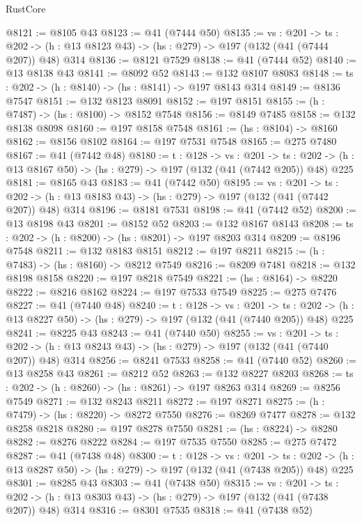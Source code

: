 \begin{lexlean}{RustCore}
\begin{coremodule}
@8121 := @8105 @43
@8123 := @41 (@7444 @50)
@8135 := {vs : @201} ->
  {ts : @202} -> (h : @13 @8123 @43) -> (hs : @279) -> @197 (@132 (@41 (@7444 @207)) @48) @314
@8136 := @8121 @7529
@8138 := @41 (@7444 @52)
@8140 := @13 @8138 @43
@8141 := @8092 @52
@8143 := @132 @8107 @8083
@8148 := {ts : @202} -> (h : @8140) -> (hs : @8141) -> @197 @8143 @314
@8149 := @8136 @7547
@8151 := @132 @8123 @8091
@8152 := @197 @8151
@8155 := (h : @7487) -> (hs : @8100) -> @8152 @7548
@8156 := @8149 @7485
@8158 := @132 @8138 @8098
@8160 := @197 @8158 @7548
@8161 := (hs : @8104) -> @8160
@8162 := @8156 @8102
@8164 := @197 @7531 @7548
@8165 := @275 @7480
@8167 := @41 (@7442 @48)
@8180 := {t : @128} ->
  {vs : @201} ->
  {ts : @202} -> (h : @13 @8167 @50) -> (hs : @279) -> @197 (@132 (@41 (@7442 @205)) @48) @225
@8181 := @8165 @43
@8183 := @41 (@7442 @50)
@8195 := {vs : @201} ->
  {ts : @202} -> (h : @13 @8183 @43) -> (hs : @279) -> @197 (@132 (@41 (@7442 @207)) @48) @314
@8196 := @8181 @7531
@8198 := @41 (@7442 @52)
@8200 := @13 @8198 @43
@8201 := @8152 @52
@8203 := @132 @8167 @8143
@8208 := {ts : @202} -> (h : @8200) -> (hs : @8201) -> @197 @8203 @314
@8209 := @8196 @7548
@8211 := @132 @8183 @8151
@8212 := @197 @8211
@8215 := (h : @7483) -> (hs : @8160) -> @8212 @7549
@8216 := @8209 @7481
@8218 := @132 @8198 @8158
@8220 := @197 @8218 @7549
@8221 := (hs : @8164) -> @8220
@8222 := @8216 @8162
@8224 := @197 @7533 @7549
@8225 := @275 @7476
@8227 := @41 (@7440 @48)
@8240 := {t : @128} ->
  {vs : @201} ->
  {ts : @202} -> (h : @13 @8227 @50) -> (hs : @279) -> @197 (@132 (@41 (@7440 @205)) @48) @225
@8241 := @8225 @43
@8243 := @41 (@7440 @50)
@8255 := {vs : @201} ->
  {ts : @202} -> (h : @13 @8243 @43) -> (hs : @279) -> @197 (@132 (@41 (@7440 @207)) @48) @314
@8256 := @8241 @7533
@8258 := @41 (@7440 @52)
@8260 := @13 @8258 @43
@8261 := @8212 @52
@8263 := @132 @8227 @8203
@8268 := {ts : @202} -> (h : @8260) -> (hs : @8261) -> @197 @8263 @314
@8269 := @8256 @7549
@8271 := @132 @8243 @8211
@8272 := @197 @8271
@8275 := (h : @7479) -> (hs : @8220) -> @8272 @7550
@8276 := @8269 @7477
@8278 := @132 @8258 @8218
@8280 := @197 @8278 @7550
@8281 := (hs : @8224) -> @8280
@8282 := @8276 @8222
@8284 := @197 @7535 @7550
@8285 := @275 @7472
@8287 := @41 (@7438 @48)
@8300 := {t : @128} ->
  {vs : @201} ->
  {ts : @202} -> (h : @13 @8287 @50) -> (hs : @279) -> @197 (@132 (@41 (@7438 @205)) @48) @225
@8301 := @8285 @43
@8303 := @41 (@7438 @50)
@8315 := {vs : @201} ->
  {ts : @202} -> (h : @13 @8303 @43) -> (hs : @279) -> @197 (@132 (@41 (@7438 @207)) @48) @314
@8316 := @8301 @7535
@8318 := @41 (@7438 @52)

\end{coremodule}
\end{lexlean}
